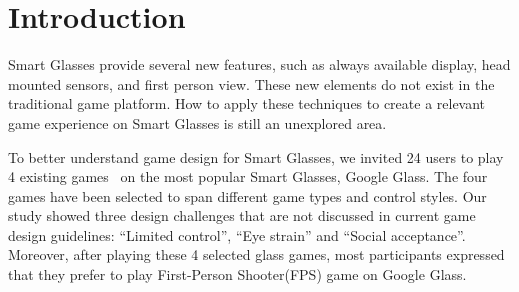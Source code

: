 \documentclass{acm_proc_article-sp}
\begin{document}



\section{Introduction}

Smart Glasses provide several new features, such as always available display, head mounted sensors, and first person view. These new elements do not exist in the traditional game platform. How to apply these techniques to create a relevant game experience on Smart Glasses is still an unexplored area.

To better understand game design for Smart Glasses, we invited 24 users to play 4 existing games~\cite{minigame} on the most popular Smart Glasses, Google Glass. The four games have been selected to span different game types and control styles. Our study showed three design challenges that are not discussed in current game design guidelines: ``Limited control'', ``Eye strain'' and ``Social acceptance''. Moreover, after playing these 4 selected glass games, most participants expressed that they prefer to play First-Person Shooter(FPS) game on Google Glass. 

\end{document}
